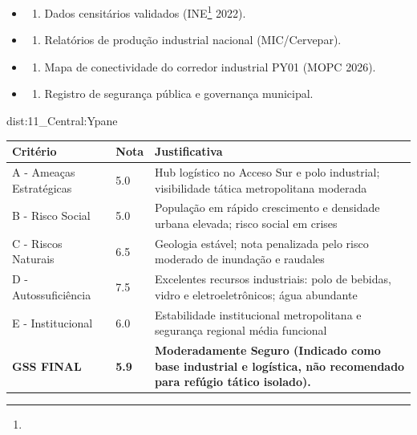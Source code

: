 {\begin{itemize}
\tightlist
\item
  \begin{enumerate}
  \def\labelenumi{\arabic{enumi})}
  \tightlist
  \item
    Dados censitários validados (INE\footnote{\fineINE} 2022).
  \end{enumerate}
\item
  \begin{enumerate}
  \def\labelenumi{\arabic{enumi})}
  \setcounter{enumi}{1}
  \tightlist
  \item
    Relatórios de produção industrial nacional (MIC/\allowbreak Cervepar).
  \end{enumerate}
\item
  \begin{enumerate}
  \def\labelenumi{\arabic{enumi})}
  \setcounter{enumi}{2}
  \tightlist
  \item
    Mapa de conectividade do corredor industrial PY01 (MOPC 2026).
  \end{enumerate}
\item
  \begin{enumerate}
  \def\labelenumi{\arabic{enumi})}
  \setcounter{enumi}{3}
  \tightlist
  \item
    Registro de segurança pública e governança municipal.
  \end{enumerate}
\end{itemize}}{dist:11_Central:Ypane}
\begin{table}[ht!]
\small \begin{tabular}{p{3.0cm}p{0.8cm}p{6.0cm}} \toprule
\textbf{Critério} & \textbf{Nota} & \textbf{Justificativa} \\ \midrule
A - Ameaças Estratégicas & 5.0 & Hub logístico no Acceso Sur e polo industrial; visibilidade tática metropolitana moderada \\
B - Risco Social & 5.0 & População em rápido crescimento e densidade urbana elevada; risco social em crises \\
C - Riscos Naturais & 6.5 & Geologia estável; nota penalizada pelo risco moderado de inundação e raudales \\
D - Autossuficiência & 7.5 & Excelentes recursos industriais: polo de bebidas, vidro e eletroeletrônicos; água abundante \\
E - Institucional & 6.0 & Estabilidade institucional metropolitana e segurança regional média funcional \\
\midrule \textbf{GSS FINAL} & \textbf{5.9} & \textbf{Moderadamente Seguro (Indicado como base industrial e logística, não recomendado para refúgio tático isolado).} \\ \bottomrule \end{tabular}
\end{table}
